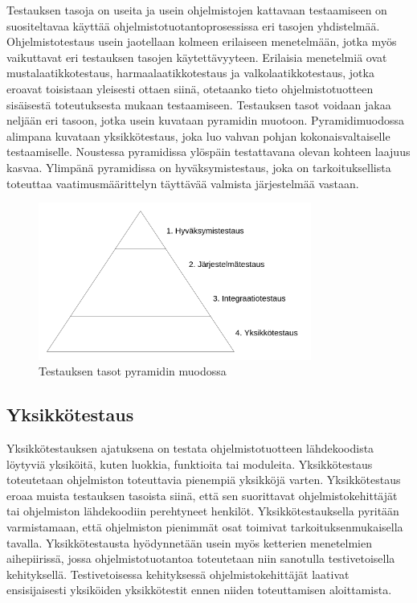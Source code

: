 Testauksen tasoja on useita ja usein ohjelmistojen kattavaan testaamiseen on suositeltavaa käyttää ohjelmistotuotantoprosessissa eri tasojen yhdistelmää.
Ohjelmistotestaus usein jaotellaan kolmeen erilaiseen menetelmään, jotka myös vaikuttavat eri testauksen tasojen käytettävyyteen.
Erilaisia menetelmiä ovat mustalaatikkotestaus, harmaalaatikkotestaus ja valkolaatikkotestaus, jotka eroavat toisistaan yleisesti ottaen siinä, otetaanko tieto ohjelmistotuotteen sisäisestä toteutuksesta mukaan testaamiseen.
Testauksen tasot voidaan jakaa neljään eri tasoon, jotka usein kuvataan pyramidin muotoon.
Pyramidimuodossa alimpana kuvataan yksikkötestaus, joka luo vahvan pohjan kokonaisvaltaiselle testaamiselle.
Noustessa pyramidissa ylöspäin testattavana olevan kohteen laajuus kasvaa.
Ylimpänä pyramidissa on hyväksymistestaus, joka on tarkoituksellista toteuttaa vaatimusmäärittelyn täyttävää valmista järjestelmää vastaan.
\begin{figure}[H]
  \centering
  \includegraphics[width=0.8\textwidth]{assets/testing-levels-pyramid.png}
  \caption{Testauksen tasot pyramidin muodossa}
  \label{fig:testing-levels-pyramid}
\end{figure}

  \subsection{Yksikkötestaus}

  Yksikkötestauksen ajatuksena on testata ohjelmistotuotteen lähdekoodista löytyviä yksiköitä, kuten luokkia, funktioita tai moduleita.
  Yksikkötestaus toteutetaan ohjelmiston toteuttavia pienempiä yksikköjä varten.
  Yksikkötestaus eroaa muista testauksen tasoista siinä, että sen suorittavat ohjelmistokehittäjät tai ohjelmiston lähdekoodiin perehtyneet henkilöt.
  Yksikkötestauksella pyritään varmistamaan, että ohjelmiston pienimmät osat toimivat tarkoituksenmukaisella tavalla.
  Yksikkötestausta hyödynnetään usein myös ketterien menetelmien aihepiirissä, jossa ohjelmistotuotantoa toteutetaan niin sanotulla testivetoisella kehityksellä.
  Testivetoisessa kehityksessä ohjelmistokehittäjät laativat ensisijaisesti yksiköiden yksikkötestit ennen niiden toteuttamisen aloittamista.

